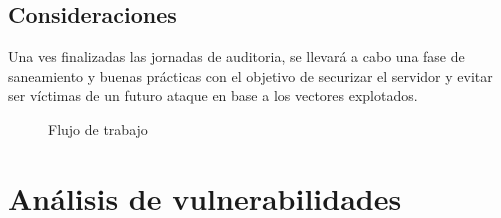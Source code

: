 \documentclass[a4paper]{article}
\begin{document}
  \subsection{Consideraciones}
  Una ves finalizadas las jornadas de auditoria, se llevará a cabo una fase de saneamiento y buenas prácticas con el objetivo de securizar el servidor y evitar ser víctimas de un futuro ataque en base a los vectores explotados.
  \begin{figure}[h]
    \begin{center}
    \end{center}
    \caption{Flujo de trabajo}
  \end{figure}
  \newpage
  \section{Análisis de vulnerabilidades}
\end{document}
